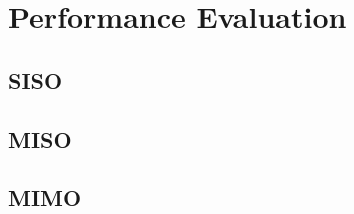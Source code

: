 \chapter{Performance Evaluation}



\section{SISO}\label{sec:siso}
  

\section{MISO}\label{sec:miso}
  

\section{MIMO}\label{sec:mimo}
   